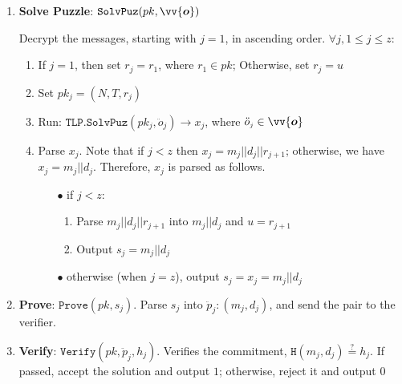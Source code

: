 \begin{enumerate}[leftmargin=.4cm]
\item\textbf{Solve Puzzle}:  $\mathtt{SolvPuz}(pk, \vv{\bm{o}})$ 

 Decrypt the messages, starting with $j=1$, in ascending order.  $\forall j, 1\leq j\leq z:$
 
\begin{enumerate}
\item If $j=1$, then set $r_{\scriptscriptstyle j}=r_{\scriptscriptstyle 1}$, where $r_{\scriptscriptstyle 1}\in pk$; Otherwise, set $r_{\scriptscriptstyle j}=u$

\item Set  $pk_{\scriptscriptstyle j}=(N,T,r_{\scriptscriptstyle j})$

\item\label{call-RTLP-SolvPuz} Run: $\mathtt{TLP.SolvPuz}(pk_{\scriptscriptstyle j},\ddot{o}_{\scriptscriptstyle j})\rightarrow x_{\scriptscriptstyle j}$, where $\ddot{o}_{\scriptscriptstyle j}\in \vv{\bm{o}}$


\item\label{Dec-message} Parse $x_{\scriptscriptstyle j}$. Note that if $j<z$ then $x_{\scriptscriptstyle j}=m_{\scriptscriptstyle j}||d_{\scriptscriptstyle j}||r_{\scriptscriptstyle j+1}$; otherwise,  we have $x_{\scriptscriptstyle j}=m_{\scriptscriptstyle j}||d_{\scriptscriptstyle j}$. Therefore, $x_{\scriptscriptstyle j}$ is parsed as follows.




\begin{itemize}
\item[$\bullet$] if $j<z: $
\begin{enumerate}

\item Parse $m_{\scriptscriptstyle j}||d_{\scriptscriptstyle j}||r_{\scriptscriptstyle j+1}$ into  $m_{\scriptscriptstyle j}||d_{\scriptscriptstyle j}$ and $u=r_{\scriptscriptstyle j+1}$
\item Output $s_{\scriptscriptstyle j}=m_{\scriptscriptstyle j}||d_{\scriptscriptstyle j}$
\end{enumerate}
\item[$\bullet$] otherwise (when $j=z$),  output $s_{\scriptscriptstyle j}=x_{\scriptscriptstyle j}=m_{\scriptscriptstyle j}||d_{\scriptscriptstyle j}$


\end{itemize}

\end{enumerate}

\item\label{prove-} \textbf{Prove}:  $\mathtt{Prove}(pk, s_{\scriptscriptstyle j})$. Parse  $s_{\scriptscriptstyle j}$ into $\ddot{p}_{\scriptscriptstyle j}: (m_{\scriptscriptstyle j},d_{\scriptscriptstyle j})$, and send the pair to the verifier. 
\item\label{verify-} \textbf{Verify}: $\mathtt{Verify}(pk,\ddot{p}_{\scriptscriptstyle j}, h_{\scriptscriptstyle j})$. Verifies the commitment,  $\mathtt{H}(m_{\scriptscriptstyle j},d_{\scriptscriptstyle j})\stackrel{\scriptscriptstyle?}=h_{\scriptscriptstyle j}$. If passed, accept the solution and output $1$; otherwise,  reject it and output $0$




\end{enumerate}
